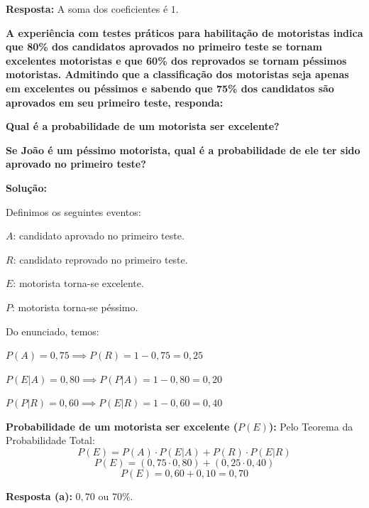 \documentclass[a4paper,10pt,landscape,twocolumn]{article}  %
\let\oldenumerate\enumerate
\let\oldendenumerate\endenumerate
\renewenvironment{enumerate}{%
  \oldenumerate%
  \setlength{\itemsep}{1pt}%
  \setlength{\parskip}{0pt}%
  \setlength{\parsep}{0pt}%
  \setlength{\topsep}{2pt}%
  \setlength{\partopsep}{0pt}%
}{%
  \oldendenumerate%
}
\let\olditemize\itemize
\let\oldenditemize\enditemize
\renewenvironment{itemize}{%
  \olditemize%
  \setlength{\itemsep}{1pt}%
  \setlength{\parskip}{0pt}%
  \setlength{\parsep}{0pt}%
  \setlength{\topsep}{2pt}%
  \setlength{\partopsep}{0pt}%
}{%
  \oldenditemize%
}
\begin{document}
\begin{enumerate}
    \textbf{Resposta:} A soma dos coeficientes é $1$.
	
    \item \textbf{A experiência com testes práticos para habilitação de motoristas indica que 80\% dos candidatos aprovados no primeiro teste se tornam excelentes motoristas e que 60\% dos reprovados se tornam péssimos motoristas. Admitindo que a classificação dos motoristas seja apenas em excelentes ou péssimos e sabendo que 75\% dos candidatos são aprovados em seu primeiro teste, responda:}
    \begin{enumerate}
        \item \textbf{Qual é a probabilidade de um motorista ser excelente?}
        \item \textbf{Se João é um péssimo motorista, qual é a probabilidade de ele ter sido aprovado no primeiro teste?}
    \end{enumerate}
    
    \textbf{Solução:}
    
    Definimos os seguintes eventos:
    \begin{itemize}
        \item $A$: candidato aprovado no primeiro teste.
        \item $R$: candidato reprovado no primeiro teste.
        \item $E$: motorista torna-se excelente.
        \item $P$: motorista torna-se péssimo.
    \end{itemize}
    
    Do enunciado, temos:
    \begin{itemize}
        \item $P(A) = 0,75 \implies P(R) = 1 - 0,75 = 0,25$
        \item $P(E|A) = 0,80 \implies P(P|A) = 1 - 0,80 = 0,20$
        \item $P(P|R) = 0,60 \implies P(E|R) = 1 - 0,60 = 0,40$
    \end{itemize}
    
    \begin{enumerate}
        \item \textbf{Probabilidade de um motorista ser excelente ($P(E)$):}
        Pelo Teorema da Probabilidade Total:
        \[ P(E) = P(A) \cdot P(E|A) + P(R) \cdot P(E|R) \]
        \[ P(E) = (0,75 \cdot 0,80) + (0,25 \cdot 0,40) \]
        \[ P(E) = 0,60 + 0,10 = 0,70 \]
        
        \textbf{Resposta (a):} $0,70$ ou $70\%$.
        

\end{enumerate}
\end{enumerate}
\end{document}
